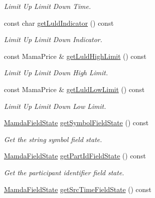 \begin{CompactItemize}
\begin{CompactList}\small\item\em Limit Up Limit Down Time. \item\end{CompactList}\item 
const char \hyperlink{classWombat_1_1MamdaSecStatusListener_eee57407b1b230ed6886469a56007980}{get\-Luld\-Indicator} () const 
\begin{CompactList}\small\item\em Limit Up Limit Down Indicator. \item\end{CompactList}\item 
const Mama\-Price \& \hyperlink{classWombat_1_1MamdaSecStatusListener_92b109794eecdf44d3ae6f9ff6113a2b}{get\-Luld\-High\-Limit} () const 
\begin{CompactList}\small\item\em Limit Up Limit Down High Limit. \item\end{CompactList}\item 
const Mama\-Price \& \hyperlink{classWombat_1_1MamdaSecStatusListener_9a2b08e93ceb9deb618edac1e71075f3}{get\-Luld\-Low\-Limit} () const 
\begin{CompactList}\small\item\em Limit Up Limit Down Low Limit. \item\end{CompactList}\item 
\hyperlink{namespaceWombat_93aac974f2ab713554fd12a1fa3b7d2a}{Mamda\-Field\-State} \hyperlink{classWombat_1_1MamdaSecStatusListener_a4642e50a6f7606ddf2eb510356468da}{get\-Symbol\-Field\-State} () const 
\begin{CompactList}\small\item\em Get the string symbol field state. \item\end{CompactList}\item 
\hyperlink{namespaceWombat_93aac974f2ab713554fd12a1fa3b7d2a}{Mamda\-Field\-State} \hyperlink{classWombat_1_1MamdaSecStatusListener_1915e75d55253a45e543bffe36393803}{get\-Part\-Id\-Field\-State} () const 
\begin{CompactList}\small\item\em Get the participant identifier field state. \item\end{CompactList}\item 
\hyperlink{namespaceWombat_93aac974f2ab713554fd12a1fa3b7d2a}{Mamda\-Field\-State} \hyperlink{classWombat_1_1MamdaSecStatusListener_6d515670385459d9ac8165a9edc9f364}{get\-Src\-Time\-Field\-State} () const 

\end{CompactItemize}
